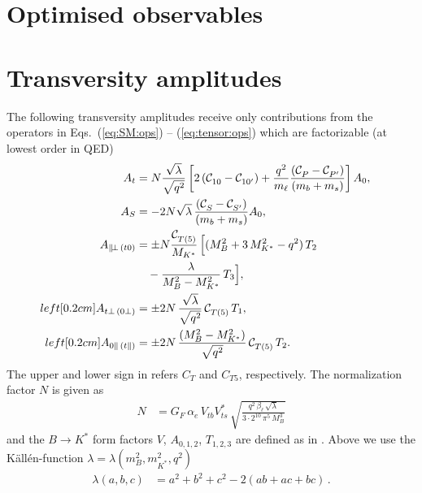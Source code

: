 %
%
\section{Optimised observables \label{sec:opt:obs}}
  
%
%
\section{Transversity amplitudes \label{sec:trAmps}}

The following transversity amplitudes receive only contributions from the operators
in Eqs.~(\ref{eq:SM:ops}) -- (\ref{eq:tensor:ops}) which are factorizable (at
lowest order in QED)
\begin{align}
  \label{eq:trAmp:At}
  A_t & = N \frac{\sqrt{\lambda}}{\sqrt{q^2}}
    \left\lbrack 2\, (\wilson[]{10} - \wilson[]{10'}) + 
     \frac{q^2}{m_\ell} \frac{(\wilson[]{P} - \wilson[]{P'})}{(m_b + m_s)}\right\rbrack A_0,
\\
  \label{eq:trAmp:As}
  A_S & = -2 N \sqrt{\lambda}\, \frac{(\wilson[]{S} - \wilson[]{S'})}{(m_b + m_s)} A_0, 
\\
  \label{eq:tensorAmpFirst}
  A_{\parallel\!\perp\,(t0)} & = \pm N \frac{\wilson[]{T(5)}}{M_{K^*}}\, \Big[ 
    (M_B^2 + 3\, M_{K^*}^2 - q^2)\, T_2\\
    & \quad - \frac{\lambda}{M_B^2 - M_{K^*}^2}\, T_3
     \Big], \nonumber
\\left\lbrack0.2cm]
  A_{t\perp\,(0\perp)} & 
    = \pm 2 N \, \frac{\sqrt{\lambda}}{\sqrt{q^2}}\,\wilson[]{T(5)}\, T_1, &
\\left\lbrack0.2cm]
  \label{eq:tensorAmpLast}
  A_{0\parallel\,(t\parallel)} &
    = \pm 2 N \, \frac{(M_B^2 - M_{K^*}^2)}{\sqrt{q^2}}\, \wilson[]{T(5)}\, T_2. &
\end{align}
The upper and lower sign in  refers 
$C_T$ and $C_{T5}$, respectively. The normalization factor $N$ is given as
\begin{align}
  \label{eq:trAmp:norm:factor}
  N & = G_F\, \alpha_e\, V_{tb}^{}V_{ts}^{*}\,
    \sqrt{\frac{q^2 \, \beta_\ell \,\sqrt{\lambda}}{3 \cdot 2^{10}\, \pi^5\, M_B^3}}
\end{align}
and the $B \to K^*$ form factors $V$, $A_{0,1,2}$, $T_{1,2,3}$ are defined as in
\cite{Beneke:2001at, Bobeth:2010wg, Ball:2004rg, Altmannshofer:2008dz,
  Kruger:2005ep, Alok:2010zd}. Above we use the K{\"a}ll{\'e}n-function 
$\lambda= \lambda(m_B^2, m_{K^*}^2, q^2)$
\begin{align}
  \label{eq:defLambda}
  \lambda(a, b, c)
    & = a^2 + b^2 + c^2 - 2(ab + ac + bc)\,.
\end{align}

